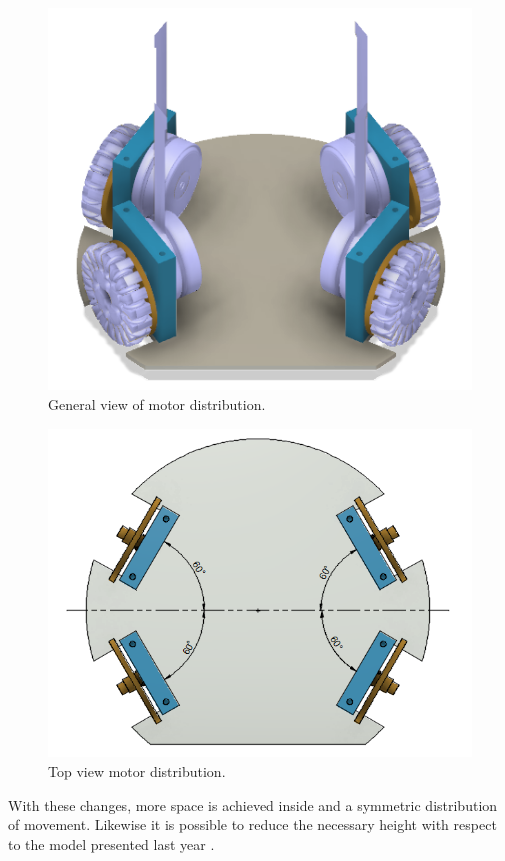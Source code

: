 \documentclass{llncs}
\begin{document}
\begin{figure}[H]
    \centering
    \includegraphics[scale=0.6]{Images/Base_Motores.jpeg}
    \caption{General view of motor distribution. }
    \label{fig:BM}
\end{figure}

\begin{figure}[H]
    \centering
    \includegraphics[scale=0.5]{Images/Base_Motores_3.jpeg}
    \caption{Top view motor distribution. }
    \label{fig:BM3}
\end{figure}

With these changes, more space is achieved inside and a symmetric distribution of movement. Likewise it is possible to reduce the necessary height with respect to the model presented last year  \cite{ais2018tdp}.
\end{document}
